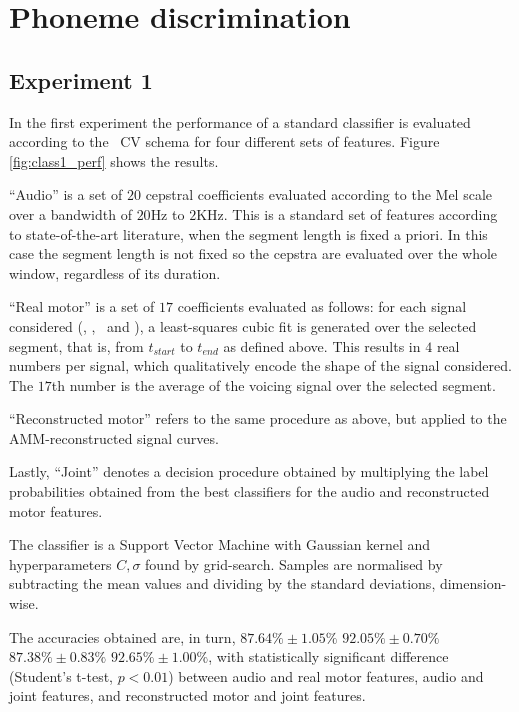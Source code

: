 \section{Phoneme discrimination}
\label{sec:class}

\subsection{Experiment 1}
\label{subsec:exp1}

In the first experiment the performance of a standard classifier is evaluated
according to the \overall\ CV schema for four different sets of features.
Figure \ref{fig:class1_perf} shows the results.

``Audio'' is a set of $20$ cepstral coefficients evaluated according to the
Mel scale over a bandwidth of $20$Hz to $2$KHz. This is a standard set of features
according to state-of-the-art literature, when the segment
length is fixed a priori. In this case the segment length is not fixed so the
cepstra are evaluated over the whole window, regardless of its duration.

``Real motor'' is a set of $17$ coefficients evaluated as follows: for each
signal considered (\vlio, \alio, \vttu\ and \attu), a least-squares cubic fit
is generated over the selected segment, that is, from $t_{start}$ to $t_{end}$
as defined above. This results in $4$ real numbers
per signal, which qualitatively encode the shape of the signal considered. The
$17$th number is the average of the voicing signal over the selected segment.

``Reconstructed motor'' refers to the same procedure as above, but applied
to the AMM-reconstructed signal curves.

Lastly, ``Joint'' denotes a decision procedure obtained by multiplying the
label probabilities obtained from the best classifiers for the audio and
reconstructed motor features.

The classifier is a Support Vector Machine \cite{BGV92} with Gaussian kernel
and hyperparameters $C, \sigma$ found by grid-search. Samples are normalised
by subtracting the mean values and dividing by the standard deviations,
dimension-wise.

The accuracies obtained are, in turn,
$87.64\% \pm 1.05\%$
$92.05\% \pm 0.70\%$
$87.38\% \pm 0.83\%$
$92.65\% \pm 1.00\%$, with statistically significant difference (Student's t-test,
$p<0.01$) between audio and real motor features, audio and joint features, and
reconstructed motor and joint features.

